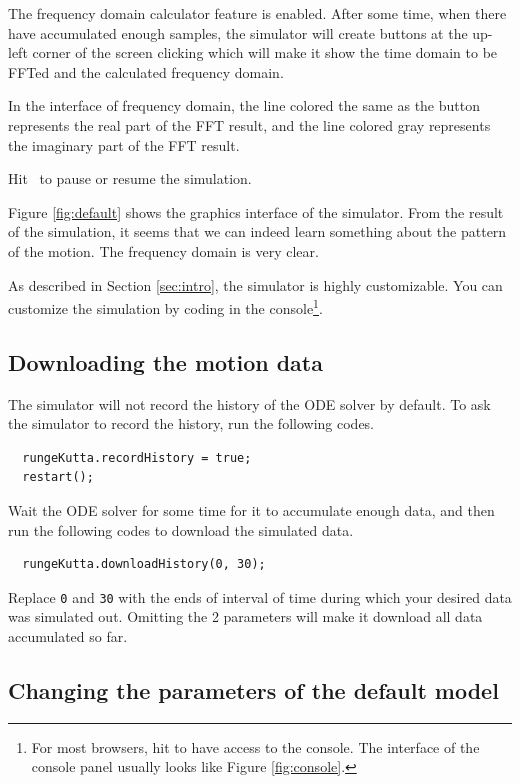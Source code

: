 \documentclass[12pt]{article}
\begin{document}
The frequency domain calculator feature is enabled.
After some time, when there have accumulated enough samples,
the simulator will create buttons at the up-left corner of the screen
clicking which will make it show the time domain to be FFTed
and the calculated frequency domain.

In the interface of frequency domain,
the line colored the same as the button represents the real part of the FFT result,
and the line colored gray represents the imaginary part of the FFT result.

Hit \LKeySpace ~to pause or resume the simulation.

Figure \ref{fig:default} shows the graphics interface of the simulator.
From the result of the simulation,
it seems that we can indeed learn something about the pattern of the motion.
The frequency domain is very clear.

As described in Section \ref{sec:intro}, the simulator is highly customizable.
You can customize the simulation by coding in the console\footnote{
  For most browsers, hit  to have access to the console.
  The interface of the console panel usually looks like Figure \ref{fig:console}.
}.

\subsection{Downloading the motion data}

The simulator will not record the history of the ODE solver by default.
To ask the simulator to record the history, run the following codes.

\begin{verbatim}
  rungeKutta.recordHistory = true;
  restart();
\end{verbatim}

Wait the ODE solver for some time for it to accumulate enough data,
and then run the following codes to download the simulated data.

\begin{verbatim}
  rungeKutta.downloadHistory(0, 30);
\end{verbatim}

Replace \texttt{0} and \texttt{30} with the ends of interval of time
during which your desired data was simulated out.
Omitting the 2 parameters will make it download all data accumulated so far.

\subsection{Changing the parameters of the default model}
\end{document}
